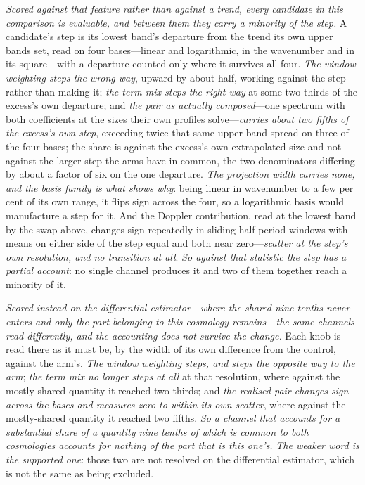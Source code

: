 \documentclass[11pt,a4paper]{article}
\theoremstyle{plain}
\theoremstyle{definition}
\theoremstyle{remark}
\begin{document}
\emph{Scored against that feature rather than against a trend, every candidate in this comparison is
evaluable, and between them they carry a minority of the step.} A candidate's step is its lowest band's
departure from the trend its own upper bands set, read on four bases---linear and logarithmic, in the
wavenumber and in its square---with a departure counted only where it survives all four. \emph{The window
weighting steps the wrong way}, upward by about half, working against the step rather than making it; \emph{the
term mix steps the right way} at some two thirds of the excess's own departure; and \emph{the pair as
actually composed}---one spectrum with both coefficients at the sizes their own profiles solve---\emph{carries
about two fifths of the excess's own step}, exceeding twice that same upper-band spread on three of the four bases; the
share is against the excess's own extrapolated size and not against the larger step the arms have in common,
the two denominators differing by about a factor of six on the one departure. \emph{The
projection width carries none, and the basis family is what shows why}: being linear in wavenumber to a few
per cent of its own range, it flips sign across the four, so a logarithmic basis would manufacture a step
for it. And the Doppler contribution, read at the lowest band by the swap above, changes sign repeatedly in
sliding half-period windows with means on either side of the step equal and both near zero---\emph{scatter at
the step's own resolution, and no transition at all}. \emph{So against that
statistic the step has a partial account}: no single channel produces it and two of them together reach a
minority of it.

\emph{Scored instead on the differential estimator---where the shared nine tenths never enters and only the
part belonging to this cosmology remains---the same channels read differently, and the accounting does not
survive the change.} Each knob is read there as it must be, by the width of its own difference from the
control, against the arm's. \emph{The window weighting steps, and steps the opposite way to the arm}; \emph{the
term mix no longer steps at all} at that resolution, where against the mostly-shared quantity it reached two
thirds; and \emph{the realised pair changes sign across the bases and measures zero to within its own
scatter}, where against the mostly-shared quantity it reached two fifths. \emph{So a channel that accounts for
a substantial share of a quantity nine tenths of which is common to both cosmologies accounts for nothing of
the part that is this one's.} \emph{The weaker word is the supported one}: those two are not resolved on the
differential estimator, which is not the same as being excluded.
\end{document}

